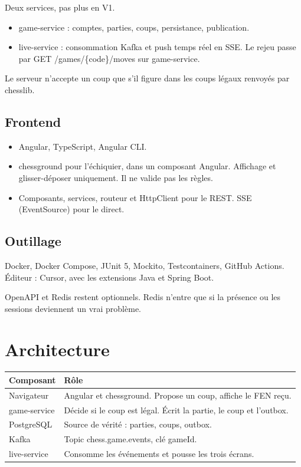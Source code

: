 \documentclass[11pt,a4paper]{article}
\newcommand{\field}[1]{{\ttfamily #1}}
\begin{document}
Deux services, pas plus en V1.

\begin{itemize}
  \item \field{game-service} : comptes, parties, coups, persistance, publication.
  \item \field{live-service} : consommation Kafka et push temps réel en SSE. Le rejeu passe par \field{GET /games/\{code\}/moves} sur \field{game-service}.
\end{itemize}

Le serveur n'accepte un coup que s'il figure dans les coups légaux renvoyés par chesslib.

\subsection{Frontend}
\begin{itemize}
  \item Angular, TypeScript, Angular CLI.
  \item chessground pour l'échiquier, dans un composant Angular. Affichage et glisser-déposer uniquement. Il ne valide pas les règles.
  \item Composants, services, routeur et HttpClient pour le REST. SSE (\field{EventSource}) pour le direct.
\end{itemize}

\subsection{Outillage}
Docker, Docker Compose, JUnit 5, Mockito, Testcontainers, GitHub Actions. Éditeur : Cursor, avec les extensions Java et Spring Boot.

OpenAPI et Redis restent optionnels. Redis n'entre que si la présence ou les sessions deviennent un vrai problème.

\section{Architecture}

\begin{tabularx}{\linewidth}{@{}Y L@{}}
\toprule
Composant & Rôle \\
\midrule
Navigateur & Angular et chessground. Propose un coup, affiche le FEN reçu. \\
game-service & Décide si le coup est légal. Écrit la partie, le coup et l'outbox. \\
PostgreSQL & Source de vérité : parties, coups, outbox. \\
Kafka & Topic \field{chess.game.events}, clé \field{gameId}. \\
live-service & Consomme les événements et pousse les trois écrans. \\
\bottomrule
\end{tabularx}
\end{document}
